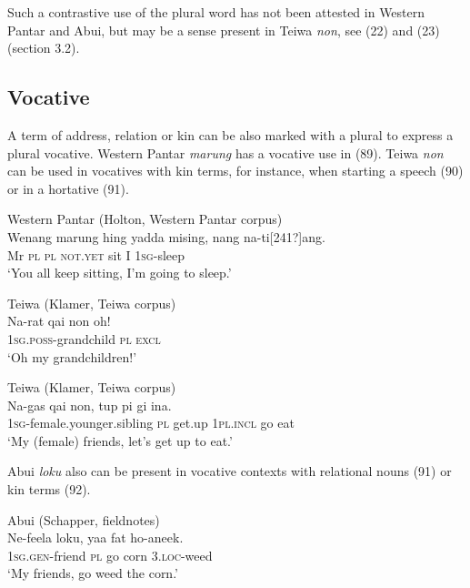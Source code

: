 Such a contrastive use of the plural word has not been attested in Western Pantar and Abui, but may be a sense present in Teiwa \textit{non}, see (22) and (23) (section 3.2).

\subsection{Vocative} %
A term of address, relation or kin can be also marked with a plural to express a plural vocative. Western Pantar \textit{marung} has a vocative use in (89). Teiwa \textit{non} can be used in vocatives with kin terms, for instance, when starting a speech (90) or in a hortative (91).


\ea%
\label{ex:88}
Western Pantar (Holton, Western Pantar corpus)\\
\gll  Wenang  marung hing yadda mising, nang {na-ti}{[241?]}{ang.} \\
   Mr  \textsc{pl} \textsc{pl} \textsc{not.yet} sit I \textsc{1sg}-sleep  \\
\glt `You all keep sitting, I'm going to sleep.'
\z







\ea%
\label{ex:89}
Teiwa (Klamer, Teiwa corpus)\\
\gll Na-rat qai non oh!  \\
  1\textsc{sg}.\textsc{poss}-grandchild \textsc{pl} \textsc{excl}   \\
\glt `Oh my grandchildren!'
\z







\ea%
\label{ex:90}
Teiwa (Klamer, Teiwa corpus)\\
\gll  Na-gas qai non, tup pi gi ina. \\
   \textsc{1sg-}female.younger.sibling \textsc{pl} get.up \textsc{1pl.incl} go eat  \\
\glt `My (female) friends, let's get up to eat.'
\z






Abui \textit{loku} also can be present in vocative contexts with relational nouns (91) or kin terms (92).


\ea%
\label{ex:91}
Abui (Schapper, fieldnotes)\\
\gll  Ne-feela loku, yaa fat ho-aneek.\\
   \textsc{1sg.gen-}friend \textsc{pl} go corn \textsc{3.loc}-weed \\
\glt `My friends, go weed the corn.'
\z







